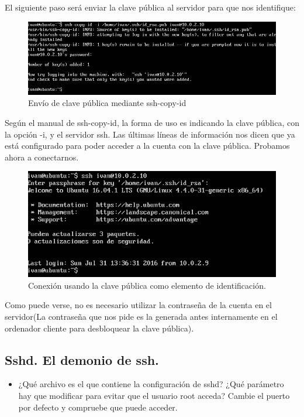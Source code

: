 El siguiente paso será enviar la clave pública al servidor para que nos identifique:

\begin{figure}[H]
	\centering
	\includegraphics[width=0.7\linewidth]{ssh-copy-id}
	\caption[Uso de copy-id]{Envío de clave pública mediante ssh-copy-id}
	\label{fig:ssh-copy-id}
\end{figure}
 
Según el manual de ssh-copy-id\cite{copy-id}, la forma de uso es indicando la clave pública, con la opción -i, y el servidor ssh. Las últimas líneas de información nos dicen que ya está configurado para poder acceder a la cuenta con la clave pública. Probamos ahora a conectarnos.

\begin{figure}[H]
	\centering
	\includegraphics[width=0.7\linewidth]{ssh_con_clave_publica}
	\caption[Conexión usando clave pública]{Conexión usando la clave pública como elemento de identificación.}
	\label{fig:ssh_con_clave_publica}
\end{figure}

Como puede verse, no es necesario utilizar la contraseña de la cuenta en el servidor(La contraseña que nos pide es la generada antes internamente en el ordenador cliente para desbloquear la clave pública).
\subsection{Sshd. El demonio de ssh.}
\begin{itemize}
	\item ¿Qué archivo es el que contiene la configuración de sshd? ¿Qué parámetro hay que modificar para evitar que el usuario root acceda? Cambie el puerto por defecto y compruebe que puede acceder.\\
	
\end{itemize}

